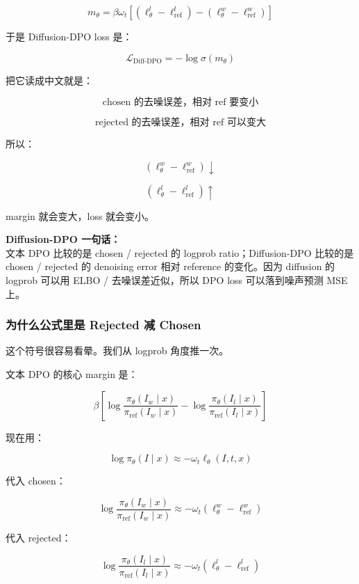 \[
m_\theta
=
\beta\omega_t
\left[
\left(
\ell_\theta^l-\ell_\text{ref}^l
\right)
-
\left(
\ell_\theta^w-\ell_\text{ref}^w
\right)
\right]
\]

于是 Diffusion-DPO loss 是：

\[
\mathcal{L}_\text{Diff-DPO}
=
-
\log
\sigma(m_\theta)
\]

把它读成中文就是：

\[
\text{chosen 的去噪误差，相对 ref 要变小}
\]

\[
\text{rejected 的去噪误差，相对 ref 可以变大}
\]

所以：

\[
\left(
\ell_\theta^w-\ell_\text{ref}^w
\right)
\downarrow
\]

\[
\left(
\ell_\theta^l-\ell_\text{ref}^l
\right)
\uparrow
\]

margin 就会变大，loss 就会变小。

\begin{summarybox}
\textbf{Diffusion-DPO 一句话：}\\
文本 DPO 比较的是 chosen / rejected 的 logprob ratio；Diffusion-DPO 比较的是 chosen / rejected 的 denoising error 相对 reference 的变化。因为 diffusion 的 logprob 可以用 ELBO / 去噪误差近似，所以 DPO loss 可以落到噪声预测 MSE 上。
\end{summarybox}

\subsubsection{为什么公式里是 Rejected 减 Chosen}

这个符号很容易看晕。我们从 logprob 角度推一次。

文本 DPO 的核心 margin 是：

\[
\beta
\left[
\log\frac{\pi_\theta(I_w\mid x)}{\pi_\text{ref}(I_w\mid x)}
-
\log\frac{\pi_\theta(I_l\mid x)}{\pi_\text{ref}(I_l\mid x)}
\right]
\]

现在用：

\[
\log\pi_\theta(I\mid x)
\approx
-
\omega_t\ell_\theta(I,t,x)
\]

代入 chosen：

\[
\log\frac{\pi_\theta(I_w\mid x)}{\pi_\text{ref}(I_w\mid x)}
\approx
-
\omega_t
\left(
\ell_\theta^w-\ell_\text{ref}^w
\right)
\]

代入 rejected：

\[
\log\frac{\pi_\theta(I_l\mid x)}{\pi_\text{ref}(I_l\mid x)}
\approx
-
\omega_t
\left(
\ell_\theta^l-\ell_\text{ref}^l
\right)
\]

